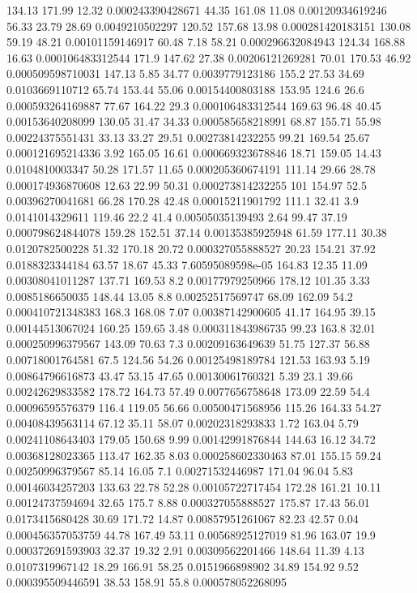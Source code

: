 134.13 171.99 12.32 0.000243390428671
44.35 161.08 11.08 0.00120934619246
56.33 23.79 28.69 0.0049210502297
120.52 157.68 13.98 0.000281420183151
130.08 59.19 48.21 0.00101159146917
60.48 7.18 58.21 0.000296632084943
124.34 168.88 16.63 0.000106483312544
171.9 147.62 27.38 0.00206121269281
70.01 170.53 46.92 0.000509598710031
147.13 5.85 34.77 0.0039779123186
155.2 27.53 34.69 0.0103669110712
65.74 153.44 55.06 0.00154400803188
153.95 124.6 26.6 0.000593264169887
77.67 164.22 29.3 0.000106483312544
169.63 96.48 40.45 0.00153640208099
130.05 31.47 34.33 0.000585658218991
68.87 155.71 55.98 0.00224375551431
33.13 33.27 29.51 0.00273814232255
99.21 169.54 25.67 0.000121695214336
3.92 165.05 16.61 0.000669323678846
18.71 159.05 14.43 0.0104810003347
50.28 171.57 11.65 0.000205360674191
111.14 29.66 28.78 0.000174936870608
12.63 22.99 50.31 0.000273814232255
101 154.97 52.5 0.00396270041681
66.28 170.28 42.48 0.00015211901792
111.1 32.41 3.9 0.0141014329611
119.46 22.2 41.4 0.00505035139493
2.64 99.47 37.19 0.000798624844078
159.28 152.51 37.14 0.00135385925948
61.59 177.11 30.38 0.0120782500228
51.32 170.18 20.72 0.000327055888527
20.23 154.21 37.92 0.0188323344184
63.57 18.67 45.33 7.60595089598e-05
164.83 12.35 11.09 0.00308041011287
137.71 169.53 8.2 0.00177979250966
178.12 101.35 3.33 0.0085186650035
148.44 13.05 8.8 0.00252517569747
68.09 162.09 54.2 0.000410721348383
168.3 168.08 7.07 0.00387142900605
41.17 164.95 39.15 0.00144513067024
160.25 159.65 3.48 0.000311843986735
99.23 163.8 32.01 0.000250996379567
143.09 70.63 7.3 0.00209163649639
51.75 127.37 56.88 0.00718001764581
67.5 124.56 54.26 0.00125498189784
121.53 163.93 5.19 0.00864796616873
43.47 53.15 47.65 0.00130061760321
5.39 23.1 39.66 0.00242629833582
178.72 164.73 57.49 0.0077656758648
173.09 22.59 54.4 0.00096595576379
116.4 119.05 56.66 0.00500471568956
115.26 164.33 54.27 0.00408439563114
67.12 35.11 58.07 0.00202318293833
1.72 163.04 5.79 0.00241108643403
179.05 150.68 9.99 0.00142991876844
144.63 16.12 34.72 0.00368128023365
113.47 162.35 8.03 0.000258602330463
87.01 155.15 59.24 0.00250996379567
85.14 16.05 7.1 0.00271532446987
171.04 96.04 5.83 0.00146034257203
133.63 22.78 52.28 0.00105722717454
172.28 161.21 10.11 0.00124737594694
32.65 175.7 8.88 0.000327055888527
175.87 17.43 56.01 0.0173415680428
30.69 171.72 14.87 0.00857951261067
82.23 42.57 0.04 0.000456357053759
44.78 167.49 53.11 0.00568925127019
81.96 163.07 19.9 0.000372691593903
32.37 19.32 2.91 0.00309562201466
148.64 11.39 4.13 0.0107319967142
18.29 166.91 58.25 0.0151966898902
34.89 154.92 9.52 0.000395509446591
38.53 158.91 55.8 0.000578052268095
